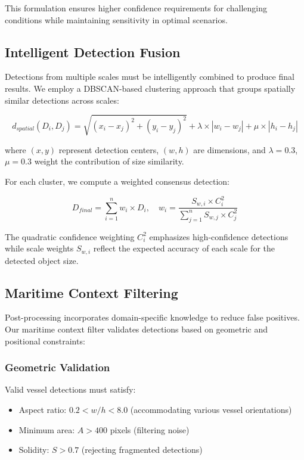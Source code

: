 \documentclass[10pt]{article}
\begin{document}
This formulation ensures higher confidence requirements for challenging conditions while maintaining sensitivity in optimal scenarios.

\subsection{Intelligent Detection Fusion}

Detections from multiple scales must be intelligently combined to produce final results. We employ a DBSCAN-based clustering approach that groups spatially similar detections across scales:

\begin{equation}
d_{spatial}(D_i, D_j) = \sqrt{(x_i - x_j)^2 + (y_i - y_j)^2} + \lambda \times |w_i - w_j| + \mu \times |h_i - h_j|
\end{equation}

where $(x, y)$ represent detection centers, $(w, h)$ are dimensions, and $\lambda = 0.3$, $\mu = 0.3$ weight the contribution of size similarity.

For each cluster, we compute a weighted consensus detection:

\begin{equation}
D_{final} = \sum_{i=1}^{n} w_i \times D_i, \quad w_i = \frac{S_{w,i} \times C_i^2}{\sum_{j=1}^{n} S_{w,j} \times C_j^2}
\end{equation}

The quadratic confidence weighting $C_i^2$ emphasizes high-confidence detections while scale weights $S_{w,i}$ reflect the expected accuracy of each scale for the detected object size.

\subsection{Maritime Context Filtering}

Post-processing incorporates domain-specific knowledge to reduce false positives. Our maritime context filter validates detections based on geometric and positional constraints:

\subsubsection{Geometric Validation}
Valid vessel detections must satisfy:
\begin{itemize}
\item Aspect ratio: $0.2 < w/h < 8.0$ (accommodating various vessel orientations)
\item Minimum area: $A > 400$ pixels (filtering noise)
\item Solidity: $S > 0.7$ (rejecting fragmented detections)
\end{itemize}
\end{document}
